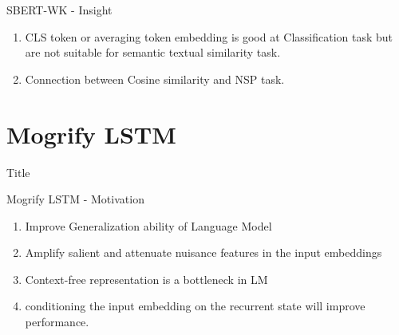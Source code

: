 \documentclass[10pt]{beamer}
\begin{document}
\begin{frame}{SBERT-WK - Insight}

    \begin{enumerate}
        \item CLS token or averaging token embedding is good at Classification task but are not suitable for semantic textual similarity task.
        \item Connection between Cosine similarity and NSP task.
    \end{enumerate}

\end{frame}

\section{Mogrify LSTM}

\begin{frame}{Title}

    \begin{figure}
        \centering 
    \end{figure}

\end{frame}

\begin{frame}{Mogrify LSTM - Motivation}
    \begin{enumerate}
        \item Improve Generalization ability of Language Model
        \item Amplify salient and attenuate nuisance features in the input embeddings
        \item Context-free representation is a bottleneck in LM
        \item conditioning the input embedding on the recurrent state will improve performance. 
    \end{enumerate}
\end{frame}
\end{document}
